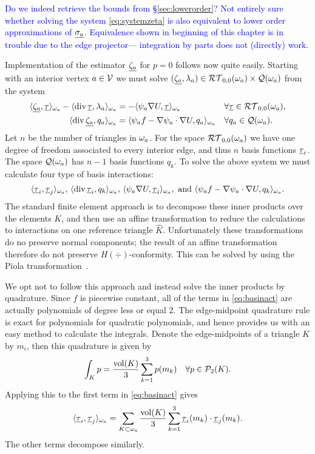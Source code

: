 \documentclass[thesis.tex]{subfiles}
\begin{document}
\textcolor{blue}{Do we indeed retrieve the bounds from \S\ref{sec:lowerorder}? Not entirely sure whether solving the system \eqref{eq:systemzeta} is also equivalent to lower 
order approximations of $\underline{\sigma_a}$. Equivalence shown in beginning of this chapter is in trouble due to the edge projector--- integration by parts does not (directly) work.}

Implementation of the estimator $\underline{\zeta_a}$ for $p=0$ follows now quite easily. 
Starting with an interior vertex $a \in \mathcal{V}$ we must solve $(\underline{\zeta_a}, \lambda_a) \in \mathcal{RT}_{0,0}(\omega_a)\times \mathcal{Q}(\omega_a)$ from the system
\begin{equation}
  \label{eq:systemp0}
  \begin{alignedat}{3}
    \langle \underline{\zeta_a}, \underline{\tau} \rangle_{\omega_a} - \langle \operatorname{div} \underline{\tau}, {\lambda_a} \rangle_{\omega_a} &= - \langle \psi_a \nabla U, \underline{\tau} \rangle_{\omega_a} && \quad \forall \underline{\tau} \in \mathcal{RT}_{0,0}(\omega_a),\\
    \langle \operatorname{div} \underline{\zeta_a}, q_a \rangle_{\omega_a} &= \langle \psi_a f - \nabla \psi_a \cdot \nabla U, q_a \rangle_{\omega_a} && \quad \forall q_a \in \mathcal{Q}(\omega_a).
  \end{alignedat}
\end{equation}
  Let $n$ be the number of triangles in $\omega_a$.
  For the space $\mathcal{RT}_{0,0}(\omega_a)$ we have one degree of freedom associated to every interior edge, and thus $n$ basis functions $\underline{\tau}_i$. The space $\mathcal{Q}(\omega_a)$ has $n-1$ basis functions $q_k$.  To solve the above system we must calculate four type of basis interactions:
  \begin{equation}
    \label{eq:basinact}
    \langle \underline{\tau}_i, \underline{\tau}_j \rangle_{\omega_a}, \, \langle \operatorname{div} \underline{\tau}_i, q_k \rangle_{\omega_a}, \, \langle \psi_a \nabla U, \underline{\tau}_i \rangle_{\omega_a}, \text{ and } \langle \psi_a f - \nabla \psi_a \cdot \nabla U, q_k \rangle_{\omega_a}.
  \end{equation}
  The standard finite element approach is to decompose these inner products over the elements $K$, and then use an affine transformation
  to reduce the calculations to interactions on one reference triangle $\hat K$. Unfortunately these transformations do no preserve
  normal components; the result of an affine transformation therefore do not preserve $H(\div)$-conformity. This can be solved 
  by using the Piola transformation~\cite[\S2.1.3]{brezzimixed}. 
  
  We opt not to follow this approach and instead solve the inner products by quadrature. Since  $f$ is piecewise constant, all of the
  terms in \eqref{eq:basinact} are actually polynomials of degree less or equal 2. 
  The edge-midpoint quadrature rule is exact for polynomials for quadratic polynomials, and hence provides us with an easy
  method to calculate the integrals. Denote the edge-midpoints of a triangle $K$ by $m_i$, then this quadrature is given by
  \[
    \int_K p = \frac{\operatorname{vol}(K)}{3} \sum_{k=1}^3 p(m_k)\quad \forall p \in \mathcal{P}_2(K).
  \]
  Applying this to the first term in \eqref{eq:basinact} gives 
  \[
  \langle \underline{\tau}_i, \underline{\tau}_j \rangle_{\omega_a} = \sum_{K \subset \omega_a} \frac{\operatorname{vol}(K)}{3}\sum_{k=1}^3 \underline{\tau}_i(m_k) \cdot \underline{\tau}_j(m_k).
  \]
  The other terms decompose similarly.  
  
\end{document}
